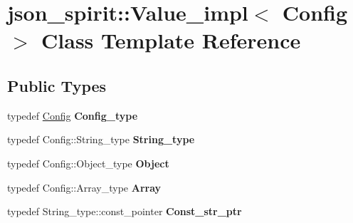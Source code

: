 \hypertarget{classjson__spirit_1_1_value__impl}{}\section{json\+\_\+spirit\+::Value\+\_\+impl$<$ Config $>$ Class Template Reference}
\label{classjson__spirit_1_1_value__impl}
\subsection*{Public Types}
\begin{DoxyCompactItemize}
\item 
\mbox{\label{classjson__spirit_1_1_value__impl_a5dc93efdb2aae96d96c9fedf37ace554}} 
typedef \mbox{\hyperlink{structjson__spirit_1_1_config__vector}{Config}} {\bfseries Config\+\_\+type}
\item 
\mbox{\label{classjson__spirit_1_1_value__impl_a7af638128a4e0dd86ab33c989c3e5ebf}} 
typedef Config\+::\+String\+\_\+type {\bfseries String\+\_\+type}
\item 
\mbox{\label{classjson__spirit_1_1_value__impl_ac4467b91c71f897bab0c6d74864ae991}} 
typedef Config\+::\+Object\+\_\+type {\bfseries Object}
\item 
\mbox{\label{classjson__spirit_1_1_value__impl_a8cbad4704c204a3421817f08a0b44dd6}} 
typedef Config\+::\+Array\+\_\+type {\bfseries Array}
\item 
\mbox{\label{classjson__spirit_1_1_value__impl_ae789c7abc9da932853db9493ddbe6101}} 
typedef String\+\_\+type\+::const\+\_\+pointer {\bfseries Const\+\_\+str\+\_\+ptr}
\end{DoxyCompactItemize}
